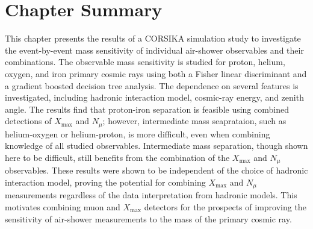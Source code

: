 \section{Chapter Summary}\label{sec:ch4_summary}
This chapter presents the results of a CORSIKA simulation study to investigate the event-by-event mass sensitivity of individual air-shower observables and their combinations.
The observable mass sensitivity is studied for proton, helium, oxygen, and iron primary cosmic rays using both a Fisher linear discriminant and a gradient boosted decision tree analysis.
The dependence on several features is investigated, including hadronic interaction model, cosmic-ray energy, and zenith angle.
The results find that proton-iron separation is feasible using combined detections of $X_{\text{max}}$ and $N_{\mu}$; however, intermediate mass seaprataion, such as helium-oxygen or helium-proton, is more difficult, even when combining knowledge of all studied observables.
Intermediate mass separation, though shown here to be difficult, still benefits from the combination of the $X_{\text{max}}$ and $N_{\mu}$ observables.
These results were shown to be independent of the choice of hadronic interaction model, proving the potential for combining $X_{\text{max}}$ and $N_{\mu}$ measurements regardless of the data interpretation from hadronic models.
This motivates combining muon and $X_{\text{max}}$ detectors for the prospects of improving the sensitivity of air-shower measurements to the mass of the primary cosmic ray.






